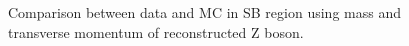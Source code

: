 \begin{figure}[hbtp]
  \centering
  \hspace{0.5cm}
  \caption{\label{fig:ZMassPt}Comparison between data and MC in SB region using mass and transverse momentum of reconstructed Z boson.}
\end{figure}

